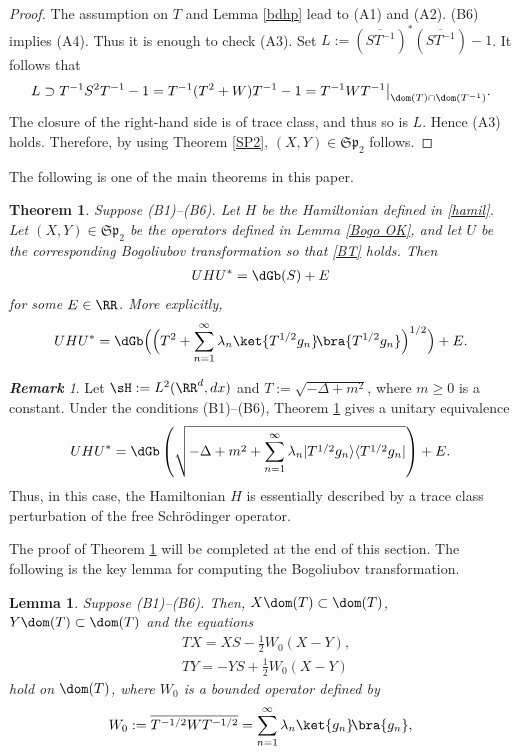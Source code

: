 \documentclass[12pt,draft]{article}
\theoremstyle{plain}
\newtheorem{thm}[theorem]{\bf Theorem}
\newtheorem{lem}[theorem]{\bf Lemma}
\numberwithin{equation}{section}
\theoremstyle{remark}
\newtheorem{rem}[theorem]{\bf Remark}
\begin{document}
\begin{proof}
The assumption on $T$ and Lemma \ref{bdhp} lead to (A1) and (A2).
(B6) implies (A4). Thus it is enough to check (A3).
Set $L:=\left(\overline{ST^{-1}}\right)^*\left(\overline{ST^{-1}}\right)-1$.
It follows that
\begin{align*}
L\supset T^{-1}S^2T^{-1}-1=T^{-1}(T^2+W)T^{-1}-1= T^{-1}WT^{-1}\big|_{\dom(T)\cap\dom(T^{-1})}.
\end{align*}
The closure of the right-hand side is of trace class, and thus so is $L$.
Hence (A3) holds.
Therefore, by using Theorem \ref{SP2}, $(X,Y)\in\mathfrak{Sp}_2$ follows.
\end{proof}

The following is one of the main theorems in this paper.
\begin{thm}\label{main}
  Suppose (B1)--(B6). Let $H$ be the Hamiltonian defined in \eqref{hamil}. 
Let $(X,Y)\in\mathfrak{Sp}_2$ be the operators defined in Lemma \ref{Bogo OK}, and 
let $U$ be the corresponding Bogoliubov transformation so that \eqref{BT} holds.
Then
\begin{align}
  UHU^* = \dGb(S)+E  \label{ExpDiag}
\end{align}
for some $E\in\RR$. More explicitly,
\begin{align*}
  UHU^* = \dGb\Big(\Big( T^2+\sum_{n=1}^\infty\lambda_n\ket{T^{1/2}g_n}\!\bra{T^{1/2}g_n}\Big)^{1/2}\Big) + E.
\end{align*}
\end{thm}

\begin{rem}
Let $\sH:=L^2(\RR^d,dx)$ and $T:=\sqrt{-\Delta+m^2}$, where $m\geq 0$ is a constant.
Under the conditions (B1)--(B6), Theorem \ref{main} gives a unitary equivalence 
\[
UHU^*= \dGb \left(\sqrt{-\Delta+m^2+\sum_{n=1}^{\infty}\lambda_n|T^{1/2}g_n\rangle\langle T^{1/2}g_n|}\right) + E.
\]
Thus, in this case, the Hamiltonian $H$ is essentially described by a trace class perturbation of the free Schr\"odinger operator.
\end{rem}


The proof of Theorem \ref{main} will be completed at the end of this section.
The following is the key lemma for computing the Bogoliubov transformation.
\begin{lem}{\label{interP}}
Suppose (B1)--(B6). Then, $X\dom(T)\subset \dom(T)$, 
$Y\dom(T)\subset \dom(T)$ and the equations 
\begin{align*}
  & TX = XS - \frac{1}{2}W_0(X-Y), \\
  & TY = -YS + \frac{1}{2}W_0(X-Y)
\end{align*}
hold on $\dom(T)$, where $W_0$ is a bounded operator defined by
\begin{align}
  W_0 := \overline{T^{-1/2}WT^{-1/2}} = \sum_{n=1}^\infty \lambda_n \ket{g_n} \! \bra{g_n}, \label{defW0}
\end{align}
\end{lem}
\end{document}
